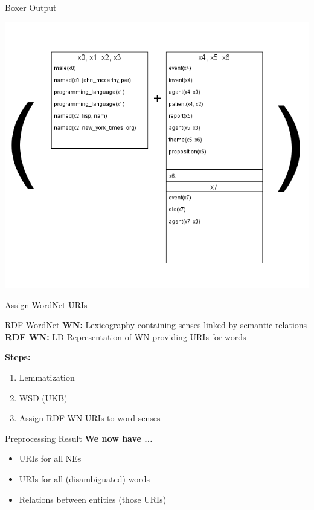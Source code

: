 \documentclass[11pt]{beamer}
\begin{document}
		\begin{frame}{Boxer Output}
			\begin{center}
				\includegraphics[scale=0.3]{img/oie-boxer-output.png}
			\end{center}
		\end{frame}
		
		\begin{frame}{Assign WordNet URIs}
			\begin{block}{RDF WordNet}
				\textbf{WN:} Lexicography containing senses linked by semantic relations\\
				\textbf{RDF WN:} LD Representation of WN providing URIs for words
			\end{block}
			
			\textbf{Steps:}\\
			\begin{enumerate}
				\item Lemmatization
				\item WSD (UKB)
				\item Assign RDF WN URIs to word senses			
			\end{enumerate}						
		\end{frame}		
		
		\begin{frame}{Preprocessing Result}
			\textbf{We now have ...}
			\begin{itemize}
				\item URIs for all NEs
				\item URIs for all (disambiguated) words
				\item Relations between entities (those URIs)
			\end{itemize}
		\end{frame}				
		
\end{document}
